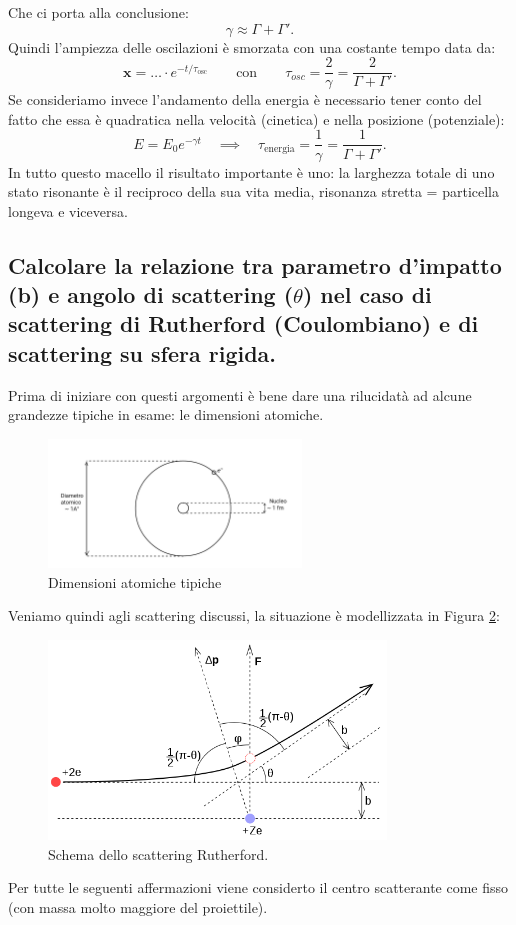 Che ci porta alla conclusione:
\[
\gamma \approx \Gamma + \Gamma' 
.\]
Quindi l'ampiezza delle oscilazioni è smorzata con una costante tempo data da:
\[
	\boldsymbol{x} = \ldots \cdot e^{- t /\tau_{\text{osc}}} \quad \quad \text{con} \quad \quad
\tau_{osc} = \frac{2}{\gamma} = \frac{2}{\Gamma + \Gamma'}
.\]
Se consideriamo invece l'andamento della energia è necessario tener conto del fatto che essa è quadratica nella velocità (cinetica) e nella posizione (potenziale): 
\[
E = E_0 e^{- \gamma t} \quad \implies \quad \tau_{\text{energia}} = \frac{1}{\gamma} = \frac{1}{\Gamma + \Gamma'}
.\]
In tutto questo macello il risultato importante è uno: la larghezza totale di uno stato risonante è il reciproco della sua vita media, risonanza stretta = particella longeva e viceversa.

\subsection[\hspace{2mm} Relazione tra parametro di impatto (b) e angolo di scattering ($\theta$) nel caso Rutherford]{Calcolare la relazione tra parametro d'impatto (b) e angolo di scattering ($\theta$) nel caso di scattering di Rutherford (Coulombiano) e di scattering su sfera rigida.} 
\label{sec:2.b.20}
Prima di iniziare con questi argomenti è bene dare una rilucidatà ad alcune grandezze tipiche in esame: le dimensioni atomiche.
\begin{figure}[H]
	\centering
	\includegraphics[width=0.6\textwidth]{immagini/dim-atomo.png}
	\caption{Dimensioni atomiche tipiche}
	\label{fig:atomo}
\end{figure}
Veniamo quindi agli scattering discussi, la situazione è modellizzata in Figura \ref{fig:rutherford}:
\begin{figure}[H]
	\centering
	\includegraphics[width=0.8\textwidth]{immagini/rutherford.png}
	\caption{Schema dello scattering Rutherford.}
	\label{fig:rutherford}
\end{figure}
Per tutte le seguenti affermazioni viene considerto il centro scatterante come fisso (con massa molto maggiore del proiettile).
